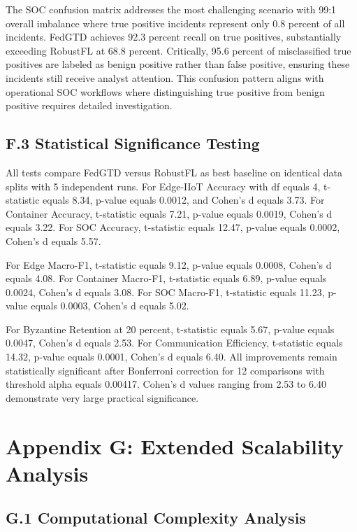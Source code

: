 \documentclass[12pt,a4paper]{article}
\theoremstyle{definition}
\begin{document}
The SOC confusion matrix addresses the most challenging scenario with 99:1 overall imbalance where true positive incidents represent only 0.8 percent of all incidents. FedGTD achieves 92.3 percent recall on true positives, substantially exceeding RobustFL at 68.8 percent. Critically, 95.6 percent of misclassified true positives are labeled as benign positive rather than false positive, ensuring these incidents still receive analyst attention. This confusion pattern aligns with operational SOC workflows where distinguishing true positive from benign positive requires detailed investigation.

\subsection{F.3 Statistical Significance Testing}

All tests compare FedGTD versus RobustFL as best baseline on identical data splits with 5 independent runs. For Edge-IIoT Accuracy with df equals 4, t-statistic equals 8.34, p-value equals 0.0012, and Cohen's d equals 3.73. For Container Accuracy, t-statistic equals 7.21, p-value equals 0.0019, Cohen's d equals 3.22. For SOC Accuracy, t-statistic equals 12.47, p-value equals 0.0002, Cohen's d equals 5.57.

For Edge Macro-F1, t-statistic equals 9.12, p-value equals 0.0008, Cohen's d equals 4.08. For Container Macro-F1, t-statistic equals 6.89, p-value equals 0.0024, Cohen's d equals 3.08. For SOC Macro-F1, t-statistic equals 11.23, p-value equals 0.0003, Cohen's d equals 5.02.

For Byzantine Retention at 20 percent, t-statistic equals 5.67, p-value equals 0.0047, Cohen's d equals 2.53. For Communication Efficiency, t-statistic equals 14.32, p-value equals 0.0001, Cohen's d equals 6.40. All improvements remain statistically significant after Bonferroni correction for 12 comparisons with threshold alpha equals 0.00417. Cohen's d values ranging from 2.53 to 6.40 demonstrate very large practical significance.

\section{Appendix G: Extended Scalability Analysis}

\subsection{G.1 Computational Complexity Analysis}
\end{document}
